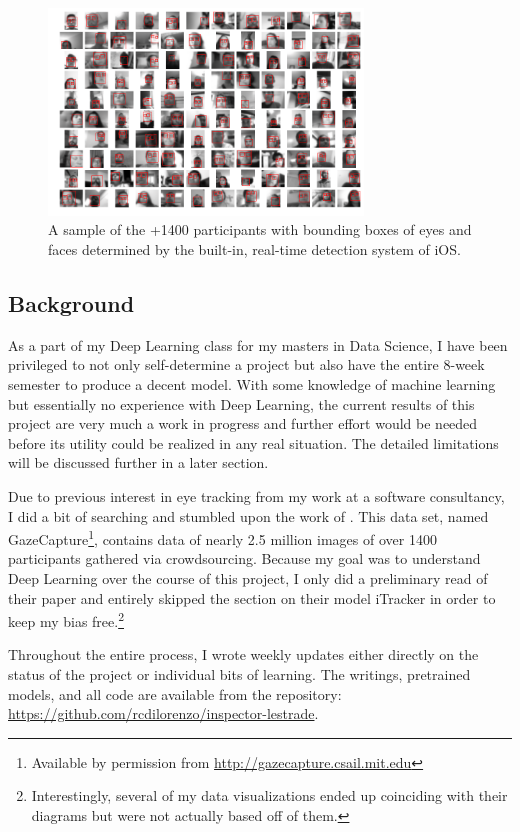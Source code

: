 \documentclass[aip, rsi, amsmath, amssymb, reprint, author-year, longbibliography]{revtex4-1}
\begin{document}
\begin{figure}
\includegraphics[height=5.5cm]{faces-blurred-grayscale-2.png}
\caption{\label{fig:faces} A sample of the +1400 participants with bounding
  boxes of eyes and faces determined by the built-in, real-time detection system
  of iOS.}
\end{figure}

\subsection{\label{sec:level2}Background}

As a part of my Deep Learning class for my masters in Data Science, I have been
privileged to not only self-determine a project but also have the entire 8-week
semester to produce a decent model. With some knowledge of machine learning but
essentially no experience with Deep Learning, the current results of this
project are very much a work in progress and further effort would be needed
before its utility could be realized in any real situation. The detailed
limitations will be discussed further in a later section.

Due to previous interest in eye tracking from my work at a software consultancy,
I did a bit of searching and stumbled upon the work of \cite{7780608}. This data
set, named GazeCapture\footnote{Available by permission from
  \url{http://gazecapture.csail.mit.edu}}, contains data of nearly 2.5 million
images of over 1400 participants gathered via crowdsourcing. Because my goal was
to understand Deep Learning over the course of this project, I only did a
preliminary read of their paper and entirely skipped the section on their model
iTracker in order to keep my bias free.\footnote{Interestingly, several of my
  data visualizations ended up coinciding with their diagrams but were not
  actually based off of them.}

Throughout the entire process, I wrote weekly updates either directly on the
status of the project or individual bits of learning. The writings, pretrained
models, and all code are available from the repository:
\url{https://github.com/rcdilorenzo/inspector-lestrade}.
\end{document}
